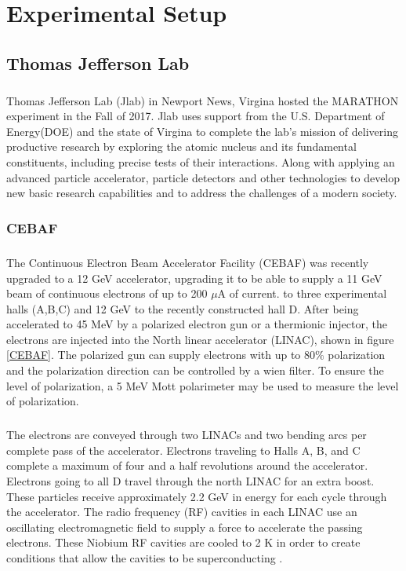 


\chapter{ Experimental Setup}

\section{Thomas Jefferson Lab}
\paragraph{}Thomas Jefferson Lab (Jlab) in Newport News, Virgina hosted the MARATHON experiment in the Fall of 2017. Jlab uses support from the U.S. Department of Energy(DOE) and the state of Virgina to complete the lab's mission of delivering productive research by exploring the atomic nucleus and its fundamental constituents, including precise tests of their interactions. Along with applying an advanced particle accelerator, particle detectors and other technologies to develop new basic research capabilities and to address the challenges of a modern society.
	\subsection{CEBAF}
	\paragraph{}The Continuous Electron Beam Accelerator Facility (CEBAF) was recently upgraded to a 12 GeV accelerator, upgrading it to be able to supply a 11 GeV beam of continuous electrons of up to 200 $\mu$A of current. to three experimental halls (A,B,C) and 12 GeV to the recently constructed hall D. After being accelerated to 45 MeV by a polarized electron gun or a thermionic injector, the electrons are injected into the North linear accelerator (LINAC), shown in figure \ref{CEBAF}. The polarized gun can supply electrons with up to 80$\%$ polarization and the polarization direction can be controlled by a wien filter. To ensure the level of polarization, a 5 MeV Mott polarimeter may be used to measure the level of polarization\cite{HallA}.
	\paragraph{} The electrons are conveyed through two LINACs and two bending arcs per complete pass of the accelerator. Electrons traveling to Halls A, B, and C complete a maximum of four and a half revolutions around the accelerator. Electrons going to all D travel through the north LINAC for an extra boost. These particles receive approximately 2.2 GeV in energy for each cycle through the accelerator. The radio frequency (RF) cavities in each LINAC use an oscillating electromagnetic field to supply a force to accelerate the passing electrons. These Niobium RF cavities are cooled to 2 K in order to create conditions that allow the cavities to be superconducting \cite{HallA}.    
	

